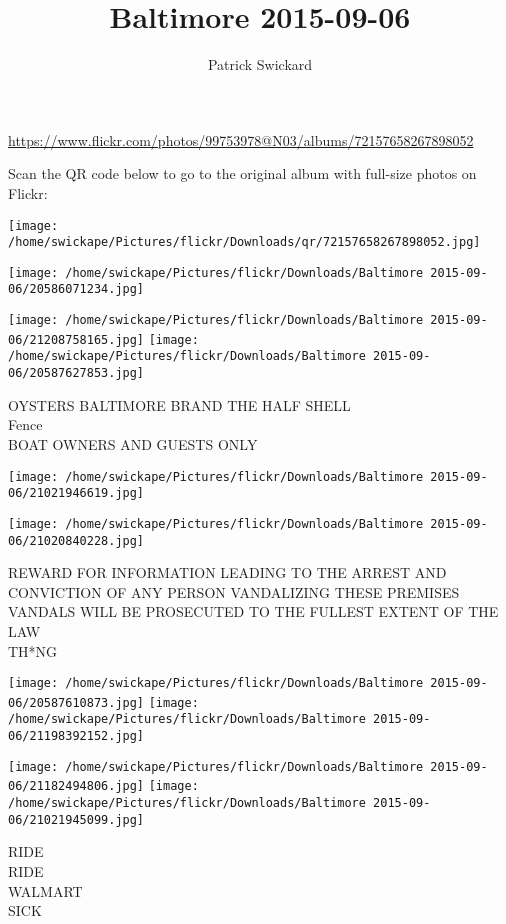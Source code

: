 \documentclass[10pt,letterpaper]{article}
\title{Baltimore 2015-09-06}
\author{Patrick Swickard}
\date{}
\begin{document}
\maketitle

\url{https://www.flickr.com/photos/99753978@N03/albums/72157658267898052}

Scan the QR code below to go to the original album with full-size photos on Flickr:

\texttt{[image: /home/swickape/Pictures/flickr/Downloads/qr/72157658267898052.jpg]}
\pagebreak

\texttt{[image: /home/swickape/Pictures/flickr/Downloads/Baltimore 2015-09-06/20586071234.jpg]}

\vspace{0.25in}
\texttt{[image: /home/swickape/Pictures/flickr/Downloads/Baltimore 2015-09-06/21208758165.jpg]}
\texttt{[image: /home/swickape/Pictures/flickr/Downloads/Baltimore 2015-09-06/20587627853.jpg]}

OYSTERS BALTIMORE BRAND THE HALF SHELL\\
Fence\\
BOAT OWNERS AND GUESTS ONLY
\pagebreak

\texttt{[image: /home/swickape/Pictures/flickr/Downloads/Baltimore 2015-09-06/21021946619.jpg]}

\vspace{0.25in}
\texttt{[image: /home/swickape/Pictures/flickr/Downloads/Baltimore 2015-09-06/21020840228.jpg]}

REWARD FOR INFORMATION LEADING TO THE ARREST AND CONVICTION OF ANY PERSON VANDALIZING THESE PREMISES VANDALS WILL BE PROSECUTED TO THE FULLEST EXTENT OF THE LAW\\
TH*NG
\pagebreak

\texttt{[image: /home/swickape/Pictures/flickr/Downloads/Baltimore 2015-09-06/20587610873.jpg]}
\texttt{[image: /home/swickape/Pictures/flickr/Downloads/Baltimore 2015-09-06/21198392152.jpg]}

\texttt{[image: /home/swickape/Pictures/flickr/Downloads/Baltimore 2015-09-06/21182494806.jpg]}
\texttt{[image: /home/swickape/Pictures/flickr/Downloads/Baltimore 2015-09-06/21021945099.jpg]}

RIDE\\
RIDE\\
WALMART\\
SICK
\pagebreak
\end{document}
